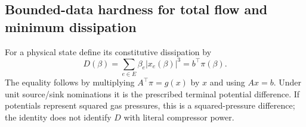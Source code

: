 \subsection{Bounded-data hardness for total flow and minimum dissipation}

For a physical state define its constitutive dissipation by
\begin{equation}
 D(\beta)=\sum_{e\in E}\beta_e|x_e(\beta)|^3
         =b^\top\pi(\beta).
 \label{eq:a-corr-dissipation}
\end{equation}
The equality follows by multiplying $A^\top\pi=g(x)$ by $x$ and using
$Ax=b$. Under unit source/sink nominations it is the prescribed terminal
potential difference. If potentials represent squared gas pressures,
this is a squared-pressure difference; the identity does not identify
$D$ with literal compressor power.

